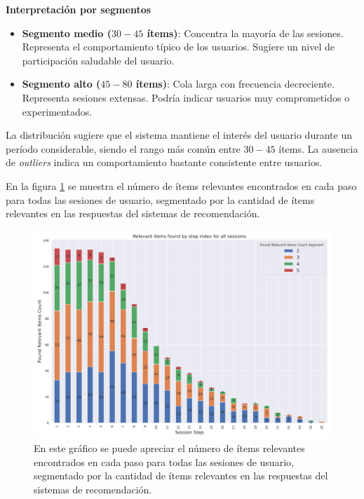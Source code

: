 \documentclass[11pt,a4paper,twoside]{thesis}
\begin{document}
\textbf{Interpretación por segmentos}

\begin{itemize}
	\item \textbf{Segmento medio ($30-45$ ítems)}: Concentra la mayoría de las sesiones. Representa el comportamiento típico de los usuarios. Sugiere un nivel de participación saludable del usuario.
	\item \textbf{Segmento alto ($45-80$ ítems)}: Cola larga con frecuencia decreciente. Representa sesiones extensas. Podría indicar usuarios muy comprometidos o experimentados.
\end{itemize}

La distribución sugiere que el sistema mantiene el interés del usuario durante un período considerable, siendo el rango más común entre $30-45$ ítems. La ausencia de \textit{outliers} indica un comportamiento bastante consistente entre usuarios.

\clearpage

En la figura \ref{fig:llama2-relevant_items_found_by_step_index_for_all_sessions} se muestra el número de ítems relevantes encontrados en cada paso para todas las sesiones de usuario, segmentado por la cantidad de ítems relevantes en las respuestas del sistemas de recomendación.

\begin{figure}[H]
	\centering
	\includegraphics[width=15cm]{./images/llama2/relevant_items_found_by_step_index_for_all_sessions.png}
	\caption{En este gráfico se puede apreciar el número de ítems relevantes encontrados en cada paso para todas las sesiones de usuario, segmentado por la cantidad de ítems relevantes en las respuestas del sistemas de recomendación.}
	\label{fig:llama2-relevant_items_found_by_step_index_for_all_sessions}
\end{figure}
\end{document}

